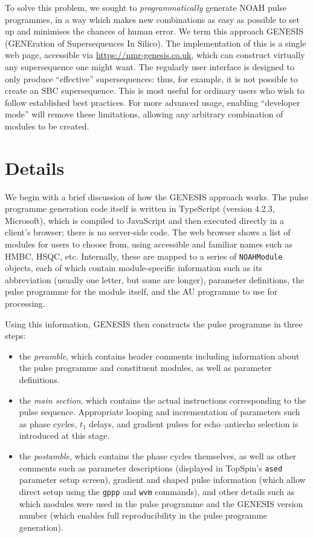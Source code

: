\documentclass[a4paper,11pt]{article}
\newcommand{\theurl}{\url{https://nmr-genesis.co.uk}}
\begin{document}
To solve this problem, we sought to \textit{programmatically} generate NOAH pulse programmes, in a way which makes new combinations as easy as possible to set up and minimises the chances of human error.
We term this approach GENESIS (GENEration of Supersequences In Silico).
The implementation of this is a single web page, accessible via \theurl{}, which can construct virtually any supersequence one might want.
The regularly user interface is designed to only produce ``effective'' supersequences: thus, for example, it is not possible to create an SBC supersequence.
This is most useful for ordinary users who wish to follow established best practices.
For more advanced usage, enabling ``developer mode'' will remove these limitations, allowing any arbitrary combination of modules to be created.

\section{Details}

We begin with a brief discussion of how the GENESIS approach works.
The pulse programme generation code itself is written in TypeScript (version 4.2.3, Microsoft), which is compiled to JavaScript and then executed directly in a client's browser; there is no server-side code.
The web browser shows a list of modules for users to choose from, using accessible and familiar names such as HMBC, HSQC, etc.
Internally, these are mapped to a series of \texttt{NOAHModule} objects, each of which contain module-specific information such as its abbreviation (usually one letter, but some are longer), parameter definitions, the pulse programme for the module itself, and the AU programme to use for processing. 

Using this information, GENESIS then constructs the pulse programme in three steps:

\begin{itemize}
    \item the \textit{preamble}, which contains header comments including information about the pulse programme and constituent modules, as well as parameter definitions. 
    \item the \textit{main section}, which contains the actual instructions corresponding to the pulse sequence. Appropriate looping and incrementation of parameters such as phase cycles, $t_1$ delays, and gradient pulses for echo--antiecho selection is introduced at this stage.
    \item the \textit{postamble}, which contains the phase cycles themselves, as well as other comments such as parameter descriptions (displayed in TopSpin's \texttt{ased} parameter setup screen), gradient and shaped pulse information (which allow direct setup using the \texttt{gppp} and \texttt{wvm} commands), and other details such as which modules were used in the pulse programme and the GENESIS version number (which enables full reproducibility in the pulse programme generation).
\end{itemize}
\end{document}
